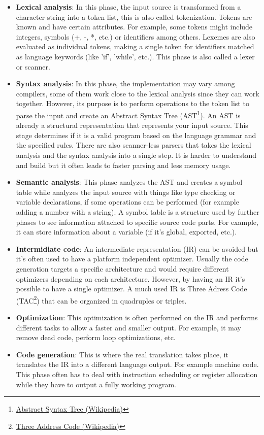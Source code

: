 \begin{itemize}
    \item \textbf{Lexical analysis}: In this phase, the input source is transformed from a character string into a token list, this is also called
        tokenization. Tokens are known and have certain attributes. For example, some tokens might include integers, symbols (+, -, *, etc.) or identifiers among others. Lexemes are also evaluated as individual tokens, making a single token for identifiers matched as language keywords
        (like 'if', 'while', etc.). This phase is also called a lexer or scanner.
    \item \textbf{Syntax analysis}: In this phase, the implementation may vary among compilers, some of them work close to the lexical analysis since they
        can work together. However, its purpose is to perform operations to the token list to parse the input and create an Abstract Syntax Tree
        (AST\footnote{\href{https://en.wikipedia.org/wiki/Abstract_syntax_tree}{Abstract Syntax Tree (Wikipedia)}}). An AST is already a structural representation that represents your input source. This stage determines if it is a valid program based on the language grammar and the specified rules. There are also scanner-less parsers that takes the lexical analysis and the syntax analysis into a single step. It is harder to understand and build but it often leads to faster parsing and less memory usage.
    \item \textbf{Semantic analysis}: This phase analyzes the AST and creates a symbol table while analyzes the input source with things like type checking or
        variable declarations, if some operations can be performed (for example adding a number with a string). A symbol table is a structure used by further phases to see information attached to specific source code parts. For example, it can store information about a variable (if it's global, exported, etc.).
    \item \textbf{Intermidiate code}: An intermediate representation (IR) can be avoided but it's often used to have a platform independent optimizer. Usually
        the code generation targets a specific architecture and would require different optimizers depending on each architecture. However, by having an IR it's possible to have a single optimizer. A much used IR is Three Adress Code (TAC\footnote{\href{https://en.wikipedia.org/wiki/Three-address_code}{Three Address Code (Wikipedia)}})
        that can be organized in quadruples or triples.
    \item \textbf{Optimization}: This optimization is often performed on the IR and performs different tasks to allow a faster and smaller output. For example, it may
        remove dead code, perform loop optimizations, etc.
    \item \textbf{Code generation}: This is where the real translation takes place, it translates the IR into a different language output. For example machine code.
        This phase often has to deal with instruction scheduling or register allocation while they have to output a fully working program.
\end{itemize}

